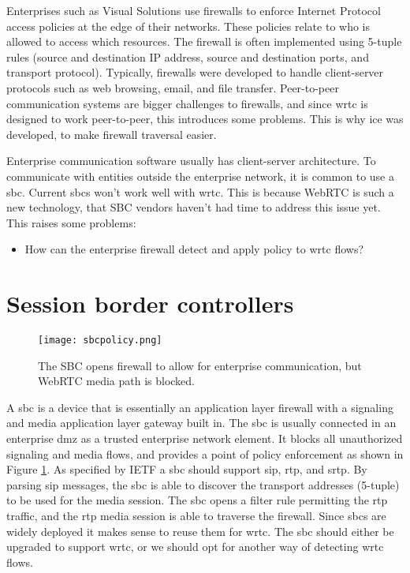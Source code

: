 Enterprises such as Visual Solutions use firewalls to enforce Internet Protocol access policies at the edge of their networks. These policies relate to who is allowed to access which resources. The firewall is often implemented using 5-tuple rules (source and destination IP address, source and destination ports, and transport protocol). Typically, firewalls were developed to handle client-server protocols such as web browsing, email, and file transfer\cite{johnston_taking_2013}. Peer-to-peer communication systems are bigger challenges to firewalls, and since \gls{wrtc} is designed to work peer-to-peer, this introduces some problems. This is why \gls{ice} was developed, to make firewall traversal easier. 

Enterprise communication software usually has client-server architecture. To communicate with entities outside the enterprise network, it is common to use a \gls{sbc}. Current \gls{sbc}s won't work well with \gls{wrtc}. This is because WebRTC is such a new technology, that SBC vendors haven't had time to address this issue yet. This raises some problems:

\begin{itemize}
\item{How can the enterprise firewall detect and apply policy to \gls{wrtc} flows?}
\end{itemize}

\section{Session border controllers}

\begin{figure}[here]
\centerline{\texttt{[image: sbcpolicy.png]}}
\caption{The SBC opens firewall to allow for enterprise communication, but WebRTC media path is blocked.}
\label{fig:sbc-policy}
\end{figure}

A \gls{sbc} is a device that is essentially an application layer firewall with a signaling and media application layer gateway built in. The \gls{sbc} is usually connected in an enterprise \gls{dmz} as a trusted enterprise network element. It blocks all unauthorized signaling and media flows, and provides a point of policy enforcement as shown in Figure \ref{fig:sbc-policy}. As specified by IETF\cite{sbc} a \gls{sbc} should support \gls{sip}, \gls{rtp}, and \gls{srtp}. By parsing \gls{sip} messages, the \gls{sbc} is able to discover the transport addresses (5-tuple) to be used for the media session. The \gls{sbc} opens a filter rule permitting the \gls{rtp} traffic, and the \gls{rtp} media session is able to traverse the firewall. Since \gls{sbc}s are widely deployed it makes sense to reuse them for \gls{wrtc}. The \gls{sbc} should either be upgraded to support \gls{wrtc}, or we should opt for another way of detecting \gls{wrtc} flows.

